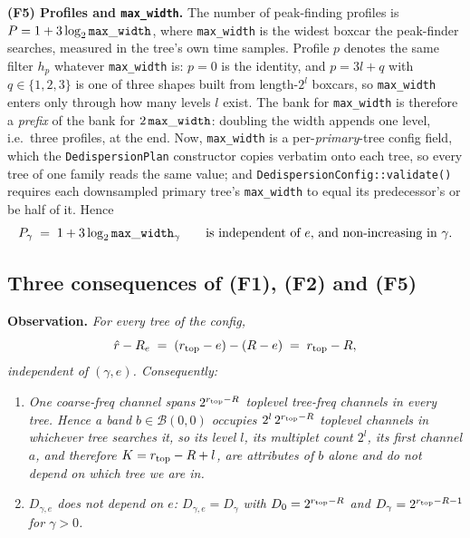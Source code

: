 \documentclass{article}
\numberwithin{equation}{section}   %
\begin{document}
\medskip
\par\noindent
{\bf (F5) Profiles and {\tt max\_width}.} The number of peak-finding profiles is
$P = 1 + 3\log_2 {\tt max\_width}$, where {\tt max\_width} is the widest boxcar the peak-finder
searches, measured in the tree's own time samples. Profile $p$ denotes the same filter $h_p$
whatever {\tt max\_width} is: $p=0$ is the identity, and $p = 3l+q$ with $q \in \{1,2,3\}$ is
one of three shapes built from length-$2^l$ boxcars, so {\tt max\_width} enters only through how
many levels $l$ exist. The bank for {\tt max\_width} is therefore a {\em prefix} of the bank for
$2\,{\tt max\_width}$: doubling the width appends one level, i.e.\ three profiles, at the end.
Now, {\tt max\_width} is a per-{\em primary}-tree config field, which the {\tt DedispersionPlan}
constructor copies verbatim onto each tree, so every tree of one family reads the same value; and
{\tt DedispersionConfig::validate()} requires each downsampled primary tree's {\tt max\_width} to
equal its predecessor's or be half of it. Hence
\begin{equation}
P_\gamma \;=\; 1 + 3\log_2 {\tt max\_width}_\gamma
\qquad \mbox{is independent of $e$, and non-increasing in $\gamma$.}
\label{eq:restriction_profiles}
\end{equation}

\subsection{Three consequences of (F1), (F2) and (F5)}
\label{ssec:restriction_bookkeeping}

\par\noindent
{\bf Observation.} {\em For every tree of the config,}
\begin{equation}
\hat r - R_e \;=\; (r_{\rm top} - e) - (R - e) \;=\; r_{\rm top} - R,
\label{eq:restriction_invariant}
\end{equation}
{\em independent of $(\gamma,e)$. Consequently:}
\begin{enumerate}
\item[(a)] {\em One coarse-freq channel spans $2^{r_{\rm top}-R}$ toplevel tree-freq channels
  in every tree. Hence a band $b \in \mathcal{B}(0,0)$ occupies $2^{l}\,2^{r_{\rm top}-R}$
  toplevel channels in whichever tree searches it, so its level $l$, its multiplet count
  $2^l$, its first channel $a$, and therefore $K = r_{\rm top} - R + l$, are attributes of $b$
  alone and do not depend on which tree we are in.}
\item[(b)] {\em $D_{\gamma,e}$ does not depend on $e$: $D_{\gamma,e} = D_\gamma$ with
  $D_0 = 2^{r_{\rm top}-R}$ and $D_\gamma = 2^{r_{\rm top}-R-1}$ for $\gamma > 0$.}
\end{enumerate}
\end{document}
